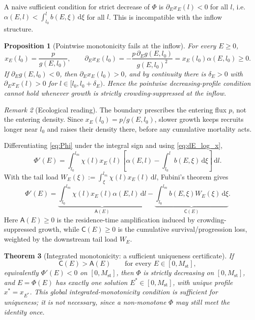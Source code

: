 \documentclass[pdflatex,sn-mathphys-num]{sn-jnl}
\newcommand{\dd}{\,\mathrm{d}}
\theoremstyle{plain}
\newtheorem{theorem}{Theorem}[section]
\newtheorem{proposition}[theorem]{Proposition}
\theoremstyle{definition}
\theoremstyle{remark}
\newtheorem{remark}[theorem]{Remark}
\begin{document}
A naive sufficient condition for strict decrease of $\Phi$ is
$\partial_Ex_E(l)<0$ for all $l$, i.e.\
$\alpha(E,l)<\int_{l_0}^l b(E,\xi)\dd\xi$ for all $l$. This is incompatible with
the inflow structure.

\begin{proposition}[Pointwise monotonicity fails at the inflow]
\label{prop:pointwise_failure}
For every $E\ge0$,
\begin{equation}\label{eq:inflow_sensitivity}
x_E(l_0)=\frac{p}{g(E,l_0)},
\qquad
\partial_Ex_E(l_0)
=
-\frac{p\,\partial_Eg(E,l_0)}{g(E,l_0)^2}
=
x_E(l_0)\alpha(E,l_0)\ge0.
\end{equation}
If $\partial_Eg(E,l_0)<0$, then $\partial_Ex_E(l_0)>0$, and by continuity there
is $\delta_E>0$ with $\partial_Ex_E(l)>0$ for $l\in[l_0,l_0+\delta_E)$. Hence the
pointwise decreasing-profile condition cannot hold whenever growth is strictly
crowding-suppressed at the inflow.
\end{proposition}

\begin{remark}[Ecological reading]
\label{rmk:inflow_interpretation}
The boundary prescribes the entering flux $p$, not the entering density. Since
$x_E(l_0)=p/g(E,l_0)$, slower growth keeps recruits longer near $l_0$ and raises
their density there, before any cumulative mortality acts.
\end{remark}

\label{subsec:integrated_derivative}

Differentiating \eqref{eq:Phi} under the integral sign and using
\eqref{eq:dE_log_x},
\[
\Phi'(E)
=
\int_{l_0}^{l_m}
\chi(l)x_E(l)
\left[
\alpha(E,l)-\int_{l_0}^{l}b(E,\xi)\dd\xi
\right]\dd l.
\]
With the tail load
$\displaystyle W_E(\xi):=\int_{\xi}^{l_m}\chi(l)x_E(l)\dd l$,
Fubini's theorem gives
\begin{equation}\label{eq:Phi_prime_tail}
\Phi'(E)
=
\underbrace{\int_{l_0}^{l_m}\chi(l)x_E(l)\alpha(E,l)\dd l}_{\mathsf A(E)}
-
\underbrace{\int_{l_0}^{l_m}b(E,\xi)W_E(\xi)\dd\xi}_{\mathsf C(E)} .
\end{equation}
Here $\mathsf A(E)\ge0$ is the residence-time amplification induced by
crowding-suppressed growth, while $\mathsf C(E)\ge0$ is the cumulative
survival/progression loss, weighted by the downstream tail load $W_E$.

\begin{theorem}[Integrated monotonicity: a sufficient uniqueness certificate]
\label{thm:integrated_monotonicity}
If
\[
\mathsf C(E)>\mathsf A(E)
\qquad\text{for every }E\in[0,M_{\mathrm{st}}],
\]
equivalently $\Phi'(E)<0$ on $[0,M_{\mathrm{st}}]$, then $\Phi$ is strictly
decreasing on $[0,M_{\mathrm{st}}]$, and $E=\Phi(E)$ has exactly one solution
$E^*\in[0,M_{\mathrm{st}}]$, with unique profile $x^*=x_{E^*}$. This global
integrated-monotonicity condition is sufficient for uniqueness; it is not
necessary, since a non-monotone $\Phi$ may still meet the identity once.
\end{theorem}
\end{document}
